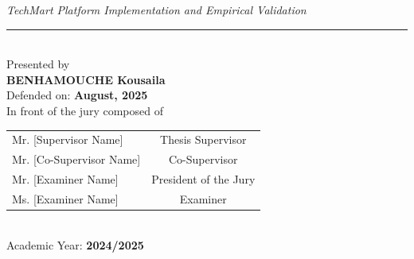 \begin{center}
{\large \textit{TechMart Platform Implementation and Empirical Validation}} \\[1cm]

\rule{13cm}{0.5pt} \\[0.4cm]

{\small Presented by} \\[0.15cm]
{\large \textbf{BENHAMOUCHE Kousaila}} \\[0.3cm]

{\small Defended on: \textbf{August, 2025}} \\[0.15cm]
{\small In front of the jury composed of} \\[0.3cm]

{\small
\begin{tabular}{lc}
Mr. [Supervisor Name] & Thesis Supervisor \\
Mr. [Co-Supervisor Name] & Co-Supervisor \\
Mr. [Examiner Name] & President of the Jury \\
Ms. [Examiner Name] & Examiner \\
\end{tabular}} \\[0.4cm]

{\small Academic Year: \textbf{2024/2025}}

\end{center}

\restoregeometry
\newpage
